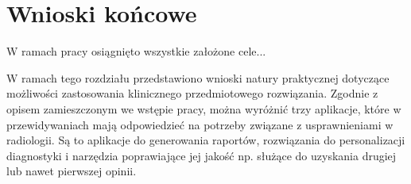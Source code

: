 {\let\clearpage\relax\chapter*{Wnioski końcowe}}

W ramach pracy osiągnięto wszystkie założone cele...

W ramach tego rozdziału przedstawiono wnioski natury praktycznej dotyczące możliwości zastosowania klinicznego przedmiotowego rozwiązania. Zgodnie z opisem zamieszczonym we wstępie pracy, można wyróżnić trzy aplikacje, które w przewidywaniach mają odpowiedzieć na potrzeby związane z usprawnieniami w radiologii. Są to aplikacje do generowania raportów, rozwiązania do personalizacji diagnostyki i narzędzia poprawiające jej jakość np. służące do uzyskania drugiej lub nawet pierwszej opinii.

